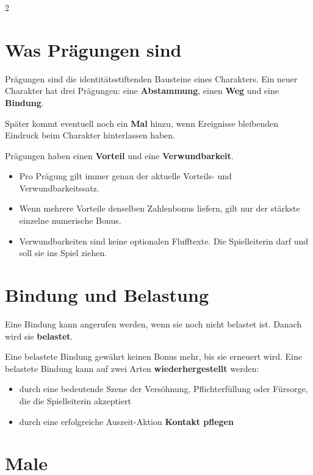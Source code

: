 \label{ch:marks}

\begin{multicols*}{2}
\section{Was Prägungen sind}\label{sec:was-pragungen-sind}

Prägungen sind die identitätsstiftenden Bausteine eines Charakters. Ein neuer Charakter hat drei Prägungen: eine \textbf{Abstammung}, einen \textbf{Weg} und eine \textbf{Bindung}.

Später kommt eventuell noch ein \textbf{Mal} hinzu, wenn Ereignisse bleibenden Eindruck beim Charakter hinterlassen haben.

Prägungen haben einen \textbf{Vorteil} und eine \textbf{Verwundbarkeit}.

\begin{itemize}[leftmargin=*]
\item Pro Prägung gilt immer genau der aktuelle Vorteils- und Verwundbarkeitssatz.
\item Wenn mehrere Vorteile denselben Zahlenbonus liefern, gilt nur der stärkste einzelne numerische Bonus.
\item Verwundbarkeiten sind keine optionalen Flufftexte.
Die Spielleiterin darf und soll sie ins Spiel ziehen.
\end{itemize}

\section{Bindung und Belastung}\label{sec:bindung-und-belastung}

Eine Bindung kann angerufen werden, wenn sie noch nicht belastet ist. Danach wird sie \textbf{belastet}.

Eine belastete Bindung gewährt keinen Bonus mehr, bis sie erneuert wird. Eine belastete Bindung kann auf zwei Arten \textbf{wiederhergestellt} werden:

\begin{itemize}[leftmargin=*]
\item durch eine bedeutende Szene der Versöhnung, Pflichterfüllung oder Fürsorge, die die Spielleiterin akzeptiert
\item durch eine erfolgreiche Auszeit-Aktion \textbf{Kontakt pflegen}
\end{itemize}

\section{Male}\label{sec:male2}


\end{multicols*}

